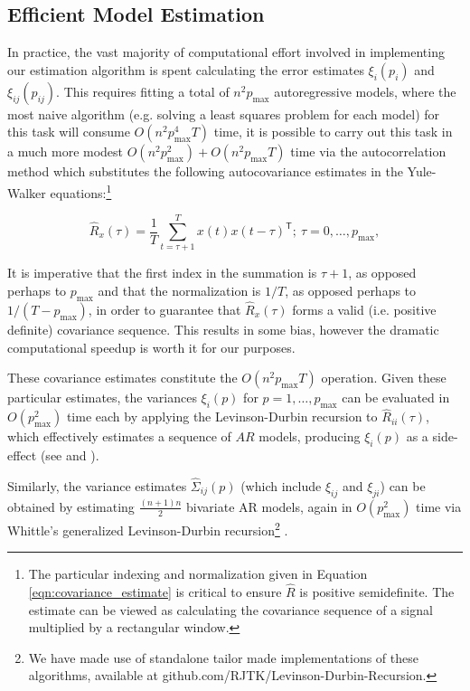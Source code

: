 \documentclass{statsoc}
\def\T{\mathsf{T}}  %
\begin{document}
\subsection{Efficient Model Estimation}
\label{sec:efficient_model_estimation}
In practice, the vast majority of computational effort involved in
implementing our estimation algorithm is spent calculating the error
estimates $\xi_i(p_i)$ and $\xi_{ij}(p_{ij})$.  This requires fitting a
total of $n^2p_{\text{max}}$ autoregressive models, where the most
naive algorithm (e.g. solving a least squares problem for each model)
for this task will consume $O(n^2p_{\text{max}}^4T)$ time, it is
possible to carry out this task in a much more modest
$O(n^2p_{\text{max}}^2 ) + O(n^2p_{\text{max}}T)$ time via the
autocorrelation method
\cite{hayes_statistical_digital_signal_processing} which substitutes
the following autocovariance estimates in the Yule-Walker
equations:\footnote{The particular indexing and normalization given in
  Equation \eqref{eqn:covariance_estimate} is critical to ensure
  $\widehat{R}$ is positive semidefinite.  The estimate can be viewed
  as calculating the covariance sequence of a signal multiplied by a
  rectangular window.}

\begin{equation}
  \label{eqn:covariance_estimate}
  \widehat{R}_x(\tau) = \frac{1}{T}\sum_{t = \tau + 1}^T x(t) x(t - \tau)^\T;\ \tau = 0, \ldots, p_{\text{max}},
\end{equation}

It is imperative that the first index in the summation is $\tau + 1$, as
opposed perhaps to $p_\text{max}$ and that the normalization is
$1 / T$, as opposed perhaps to $1 / (T - p_\text{max})$, in order to
guarantee that $\widehat{R}_x(\tau)$ forms a valid (i.e. positive
definite) covariance sequence.  This results in some bias, however the
dramatic computational speedup is worth it for our purposes.

These covariance estimates constitute the $O(n^2p_{\text{max}}T)$
operation.  Given these particular estimates, the variances $\xi_i(p)$
for $p = 1, \ldots, p_{\text{max}}$ can be evaluated in
$O(p_{\text{max}}^2)$ time each by applying the Levinson-Durbin
recursion to $\widehat{R}_{ii}(\tau)$, which effectively estimates a
sequence of $AR$ models, producing $\xi_i(p)$ as a side-effect (see
\cite{hayes_statistical_digital_signal_processing} and
\cite{levinson_durbin_recursion}).

Similarly, the variance estimates $\widehat{\Sigma}_{ij}(p)$ (which
include $\xi_{ij}$ and $\xi_{ji}$) can be obtained by estimating
$\frac{(n + 1)n}{2}$ bivariate AR models, again in
$O(p_{\text{max}}^2)$ time via Whittle's generalized Levinson-Durbin
recursion\footnote{We have made use of standalone tailor made
  implementations of these algorithms, available at
  \textsf{github.com/RJTK/Levinson-Durbin-Recursion}.}
\cite{whittle_generalized_levinson_durbin}.
\end{document}
